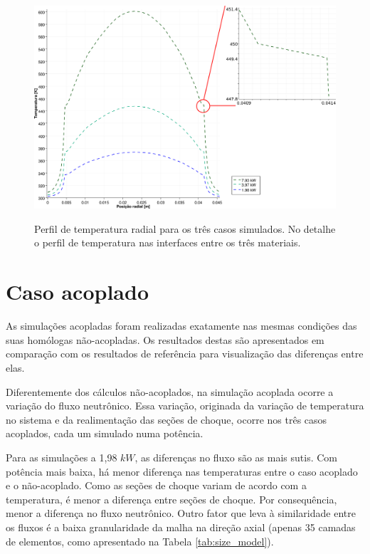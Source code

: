 \begin{figure}[htb]
  \caption[Perfil de temperatura radial para os três casos simulados.]
          {Perfil de temperatura radial para os três casos simulados. No detalhe o perfil de temperatura nas interfaces entre os três materiais.}
  \centering\includegraphics[scale=0.5]{figuras/T_x_NC_square_port_detalhado.png}
  \label{fig:perf-t-nac-radial}
\end{figure}


\section{Caso acoplado}
\label{sec:cp}

As simulações acopladas foram realizadas exatamente nas mesmas condições das suas homólogas não-acopladas.
Os resultados destas são apresentados em comparação com os resultados de referência para visualização
das diferenças entre elas.

Diferentemente dos cálculos não-acoplados, na simulação acoplada ocorre a variação do fluxo neutrônico.
Essa variação, originada da variação de temperatura no sistema e da realimentação das seções de choque, ocorre nos três casos acoplados, cada
um simulado numa potência.

Para as simulações a 1,98 $kW$, as diferenças no fluxo são as mais sutis. Com potência mais baixa, há menor
diferença nas temperaturas entre o caso acoplado e o não-acoplado. Como as seções de choque variam de
acordo com a temperatura, é menor a diferença entre seções de choque. Por consequência, menor a diferença
no fluxo neutrônico. Outro fator que leva à similaridade entre os fluxos é a baixa granularidade
da malha na direção axial (apenas 35 camadas de elementos, como apresentado na Tabela \ref{tab:size_model}).

